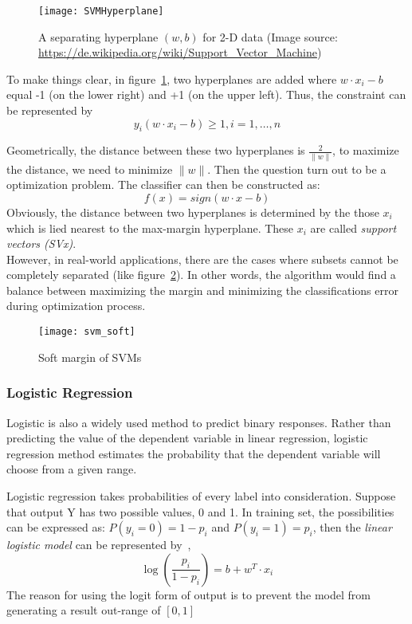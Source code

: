 \begin{figure}[h]
	\centering
	\texttt{[image: SVMHyperplane]}
	\caption{A separating hyperplane $ (w, b) $ for 2-D data (Image source: \url{https://de.wikipedia.org/wiki/Support_Vector_Machine})}
	\label{fg:SVMHyperplane}
\end{figure}

To make things clear, in figure~\ref{fg:SVMHyperplane}, two hyperplanes are added where $ w \cdot x_i-b $ equal -1 (on the lower right) and +1 (on the upper left). Thus, the constraint can be represented by
\begin{equation}
y_i(w\cdot x_i-b)\ge 1, i=1,\dots,n
\end{equation}

Geometrically, the distance between these two hyperplanes is $ \frac{2}{\lVert w \rVert} $, to maximize the distance, we need to minimize $ \lVert w \rVert $. Then the question turn out to be a optimization problem. The classifier can then be constructed as:
\begin{equation}
f(x)=sign(w\cdot x - b)
\end{equation}
Obviously, the distance between two hyperplanes is determined by the those $ x_i $ which is lied nearest to the max-margin hyperplane. These $ x_i $ are called \emph{support vectors (SVx)}.\\

However, in real-world applications, there are the cases where subsets cannot be completely separated (like figure~\ref{fg:SVM_soft})\cite[p.~113]{4_kantardzic}. In other words, the algorithm would find a balance between maximizing the margin and minimizing the classifications error during optimization process.
\begin{figure}[h]
	\centering
	\texttt{[image: svm\_soft]}
	\caption{Soft margin of SVMs}
	\label{fg:SVM_soft}
\end{figure}

\subsubsection{Logistic Regression}
Logistic is also a widely used method to predict binary responses. Rather than predicting the value of the dependent variable in linear regression, logistic regression method estimates the probability that the dependent variable will choose from a given range\cite[Section~5.6, p.~157--158]{4_kantardzic}.

 
Logistic regression takes probabilities of every label into consideration. Suppose that output Y has two possible values, 0 and 1. In training set, the possibilities can be expressed as: $ P(y_i=0)=1-p_i $ and $ P(y_i=1)=p_i $, then the \textit{linear logistic model} can be represented by~\cite[Section~5.6, p.~157--158]{4_kantardzic},
\begin{equation}
	\log (\frac{p_i}{1-p_i}) = b + w^T \cdot x_i
\end{equation}
The reason for using the logit form of output is to prevent the model from generating a result out-range of $ [0, 1] $\\


